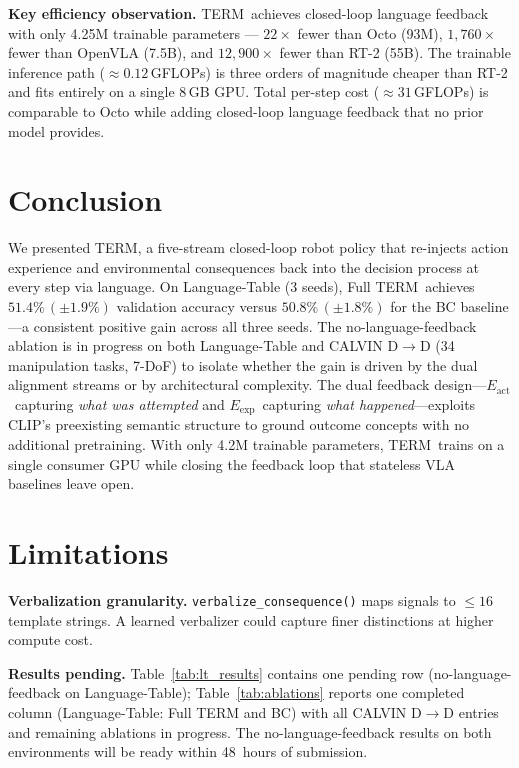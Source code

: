 \documentclass{article}
\newcommand{\modelname}{\textsc{TERM}\xspace}
\newcommand{\Lact}{$E_{\mathrm{act}}$\xspace}
\newcommand{\Lexp}{$E_{\mathrm{exp}}$\xspace}
\begin{document}
\noindent\textbf{Key efficiency observation.}
\modelname\ achieves closed-loop language feedback with only 4.25M trainable
parameters --- $22\times$ fewer than Octo (93M), $1,760\times$ fewer than
OpenVLA (7.5B), and $12,900\times$ fewer than RT-2 (55B).
The trainable inference path (${\approx}0.12$\,GFLOPs) is three orders of
magnitude cheaper than RT-2 and fits entirely on a single 8\,GB GPU.
Total per-step cost (${\approx}31$\,GFLOPs) is comparable to Octo while
adding closed-loop language feedback that no prior model provides.

\section{Conclusion}
\label{sec:conclusion}

We presented \modelname, a five-stream closed-loop robot policy that
re-injects action experience and environmental consequences back into
the decision process at every step via language.
On Language-Table (3 seeds), Full \modelname\
achieves $51.4\%\,(\pm1.9\%)$ validation accuracy versus $50.8\%\,(\pm1.8\%)$
for the BC baseline---a consistent positive gain across all three seeds.
The no-language-feedback ablation is in progress on both Language-Table
and CALVIN D$\to$D (34 manipulation tasks, 7-DoF) to isolate whether the
gain is driven by the dual alignment streams or by architectural complexity.
The dual feedback design---\Lact\ capturing \emph{what was attempted} and
\Lexp\ capturing \emph{what happened}---exploits CLIP's preexisting
semantic structure to ground outcome concepts with no additional pretraining.
With only 4.2M trainable parameters, \modelname\ trains on a single
consumer GPU while closing the feedback loop that stateless VLA
baselines leave open.

\section*{Limitations}

\textbf{Verbalization granularity.}
\texttt{verbalize\_consequence()} maps signals to $\leq16$ template strings.
A learned verbalizer could capture finer distinctions at higher compute cost.

\textbf{Results pending.}
Table~\ref{tab:lt_results} contains one pending row (no-language-feedback on Language-Table);
Table~\ref{tab:ablations} reports one completed column (Language-Table: Full TERM and BC)
with all CALVIN D$\to$D entries and remaining ablations in progress.
The no-language-feedback results on both environments will be ready within
48~hours of submission.
\end{document}
